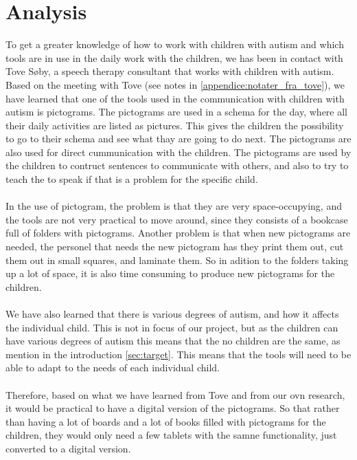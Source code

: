 \chapter{Analysis}

To get a greater knowledge of how to work with children with autism and which tools are in use in the daily work with the children, we has been in contact with  Tove S\o{}by, a speech therapy consultant that works with children with autism.\\ 

Based on the meeting with Tove (see notes in \autoref{appendice:notater_fra_tove}), we have learned that one of the tools used in the communication with children with autism is pictograms.
The pictograms are used in a schema for the day, where all their daily activities are listed as pictures. This gives the children the possibility to go to their schema and see what thay are going to do next. The pictograms are also used for direct cummunication with the children. The pictograms are used by the children to contruct sentences to communicate with others, and also to try to teach the to speak if that is a problem for the specific child.\\
\\
In the use of pictogram, the problem is that they are very space-occupying, and the tools are not very practical to move around, since they consists of a bookcase full of folders with pictograms. Another problem is that when new pictograms are needed, the personel that needs the new pictogram has they  print them out, cut them out in small squares, and laminate them. So in adition to the folders taking up a lot of space, it is also time consuming to produce new pictograms for the children.\\ 
\\
We have also learned that there is various degrees of autism, and how it affects the individual child. This is not in focus of our project, but as the children can have various degrees of autism this means that the no children are the same, as mention in the introduction \autoref{sec:target}. This means that the tools will need to be able to adapt to the needs of each individual child.\\
\\ 
Therefore, based on what we have learned from Tove and from our ovn research, it would be practical to have a digital version of the pictograms. So that rather than having a lot of boards and a lot of books filled with pictograms for the children, they would only need a few tablets with the samne functionality, just converted to a digital version.
